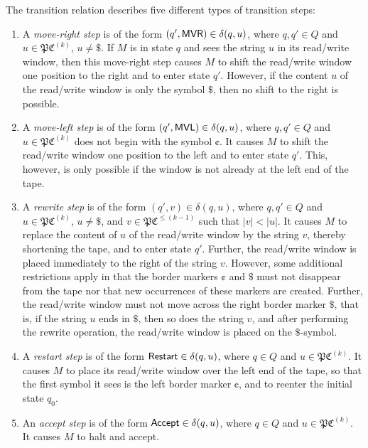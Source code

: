 The transition relation describes five different types of transition steps:

\begin{enumerate}
\item A \emph{move-right step} is of the form \index{$\MVR$}$(q', \mbox{\sf MVR}) \in \delta(q, u)$, where $q, q' \in Q$ and $u \in \mathfrak{PC}^{(k)}$, $u \neq \$$. If $M$ is in state $q$ and sees the string $u$ in its read/write window, then this move-right step causes $M$ to shift the read/write window one position to the right and to enter state $q'$. However, if the content $u$ of the read/write window is only the symbol $\$$, then no shift to the right is possible.
\item A \emph{move-left step} is of the form \index{$\MVL$}$(q', \mbox{\sf MVL}) \in \delta(q, u)$, where $q, q' \in Q$ and $u \in \mathfrak{PC}^{(k)}$ does not begin with the symbol $\cent$. It causes $M$ to shift the read/write window one position to the left and to enter state $q'$. This, however, is only possible if the window is not already at the left end of the tape.
\item A \emph{rewrite step} is of the form $(q', v) \in \delta(q, u)$, where $q, q' \in Q$ and $u \in \mathfrak{PC}^{(k)}$, $u \neq \$$, and $v \in \mathfrak{PC}^{\le (k-1)}$ such that $|v| < |u|$. It causes $M$ to replace the content of $u$ of the read/write window by the string $v$, thereby shortening the tape, and to enter state 
$q'$. Further, the read/write window is placed immediately to the right of the string $v$. However, some additional restrictions apply in that the border markers  $\cent$ and $\$$ must not disappear from the tape nor that new occurrences of these markers are created. Further, the read/write window must not move across the right border marker $\$$, that is, if the string $u$ ends in $\$$, then so does the string $v$, and after performing the rewrite operation, the read/write window is placed on the $\$$-symbol.
\item A \emph{restart step} is of the form \index{$\Restart$}$\Restart \in \delta(q, u)$, where $q \in Q$ and $u \in \mathfrak{PC}^{(k)}$. It causes $M$ to place its read/write window over the left end of the tape, so that the first symbol it sees is the left border marker $\cent$, and to reenter the initial state $q_0$.
\item An \emph{accept step} is of the form \index{$\Accept$}$\Accept \in \delta(q, u)$, where $q \in Q$ and $u \in \mathfrak{PC}^{(k)}$. It causes $M$ to halt and accept.
\end{enumerate}

